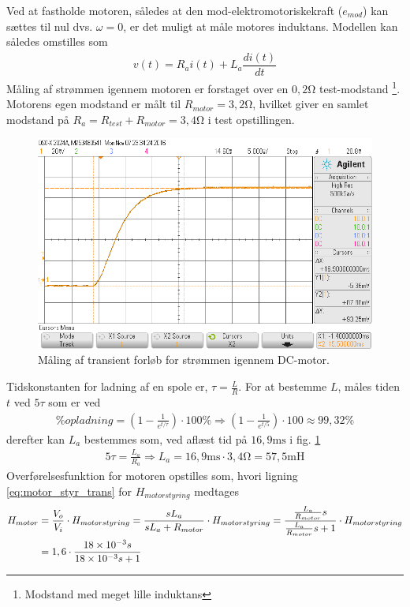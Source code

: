 Ved at fastholde motoren, således at den mod-elektromotoriskekraft ($e_{mod}$) kan sættes til nul dvs. $\omega = 0$, er det muligt at måle motores induktans.
Modellen kan således omstilles som
\begin{align}
	v(t) = R_ai(t) + L_a\dfrac{di(t)}{dt}
\end{align}
Måling af strømmen igennem motoren er forstaget over en $0,2 \si{\ohm}$ test-modstand
\footnote{Modstand med meget lille induktans}.
Motorens egen modstand er målt til $R_{motor} = 3,2 \si{\ohm}$, hvilket giver en samlet modstand på $R_a = R_{test} + R_{motor} = 3,4 \si{\ohm}$ i test opstillingen. 
\begin{figure}[h!]
	\centering
	\includegraphics[width=.8\textwidth]{billeder/motor_L.png}
	\caption{Måling af transient forløb for strømmen igennem DC-motor.}
	\label{fig:motor_dynamik_scoop}
\end{figure}
Tidskonstanten for ladning af en spole er, $\tau = \frac{L}{R}$.
For at bestemme $L$, måles tiden $t$ ved $5\tau$ som er ved
\begin{align}
	\% opladning = \left( 1 - \frac{1}{e^{t/\tau}} \right) \cdot 100\% \Rightarrow  \left( 1 - \frac{1}{e^{t/5}} \right) \cdot 100 \approx 99,32\% 
\end{align}
derefter kan $L_a$ bestemmes som, ved aflæst tid på $16,9\si{\milli\second}$ i fig. \ref{fig:motor_dynamik_scoop} 
\begin{align}
	5\tau = \frac{L_a}{R_a} \Rightarrow L_a = 16,9\si{\milli\second} \cdot 3,4 \si{\ohm} = 57,5 \si{\milli\henry}
\end{align}
Overførelsesfunktion for motoren opstilles som, hvori ligning \ref{eq:motor_styr_trans} for $H_{motorstyring}$ medtages
\begin{align}
H_{motor} &= \frac{V_o}{V_i} \cdot H_{motorstyring} = \frac{s L_a}{s L_a + R_{motor}} \cdot H_{motorstyring} = \frac{ \frac{L_a}{R_{motor}}s}{ \frac{L_a}{R_{motor}}s +1} \cdot H_{motorstyring} \\
 &= 1,6 \cdot \frac{\num{18E-3}s}{\num{18E-3}s +1}  \label{eq:motor_trans}
\end{align}  



